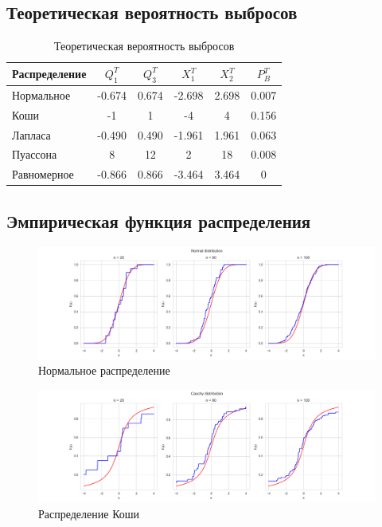\documentclass[../main.tex]{subfiles}
\begin{document}
    \subsection{Теоретическая вероятность выбросов}
    
    \begin{table}[H]
	\centering
	\begin{tabular}{|l|c|c|c|c|c|}
		\hline
		Распределение & $Q_1^T$	& $Q_3^T$ & $X_1^T$ & $X_2^T$ & $P_B^T$\\\hline
		\hline
		Нормальное & -0.674 & 0.674 & -2.698 &  2.698 & 0.007\\\hline
		Коши & -1 & 1 & -4 & 4 & 0.156\\\hline
		Лапласа & -0.490 & 0.490 & -1.961 & 1.961 & 0.063\\\hline
		Пуассона & 8 & 12 & 2 & 18 & 0.008\\\hline
		Равномерное & -0.866 & 0.866 & -3.464 & 3.464 & 0\\\hline
	\end{tabular}
	\caption{Теоретическая вероятность выбросов}
    \end{table}
    
    \subsection{Эмпирическая функция распределения}
    
    \begin{figure}[H]
        \centering
        \includegraphics[scale=0.5]{figures/NormalEmpirical.png}
        \caption{Нормальное распределение}
        \label{fig:normal}
    \end{figure}
    
    \begin{figure}[H]
        \centering
        \includegraphics[scale=0.5]{figures/CauchyEmpirical.png}
        \caption{Распределение Коши}
        \label{fig:normal}
    \end{figure}
    
\end{document}
